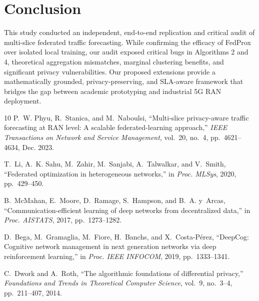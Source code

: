 \documentclass[10pt,journal,compsoc,twocolumn]{article}
\begin{document}
\section{Conclusion}
This study conducted an independent, end-to-end replication and critical audit of multi-slice federated traffic forecasting. While confirming the efficacy of FedProx over isolated local training, our audit exposed critical bugs in Algorithms 2 and 4, theoretical aggregation mismatches, marginal clustering benefits, and significant privacy vulnerabilities. Our proposed extensions provide a mathematically grounded, privacy-preserving, and SLA-aware framework that bridges the gap between academic prototyping and industrial 5G RAN deployment.


\begin{thebibliography}{10}
P.~W. Phyu, R.~Stanica, and M.~Naboulsi, ``Multi-slice privacy-aware traffic forecasting at RAN level: A scalable federated-learning approach,'' \emph{IEEE Transactions on Network and Service Management}, vol.~20, no.~4, pp.~4621--4634, Dec. 2023.

T.~Li, A.~K. Sahu, M.~Zahir, M.~Sanjabi, A.~Talwalkar, and V.~Smith, ``Federated optimization in heterogeneous networks,'' in \emph{Proc. MLSys}, 2020, pp.~429--450.

B.~McMahan, E.~Moore, D.~Ramage, S.~Hampson, and B.~A. y~Arcas, ``Communication-efficient learning of deep networks from decentralized data,'' in \emph{Proc. AISTATS}, 2017, pp.~1273--1282.

D.~Bega, M.~Gramaglia, M.~Fiore, H.~Banchs, and X.~Costa-P{\'e}rez, ``DeepCog: Cognitive network management in next generation networks via deep reinforcement learning,'' in \emph{Proc. IEEE INFOCOM}, 2019, pp.~1333--1341.

C.~Dwork and A.~Roth, ``The algorithmic foundations of differential privacy,'' \emph{Foundations and Trends in Theoretical Computer Science}, vol.~9, no.~3--4, pp.~211--407, 2014.
\end{thebibliography}
\end{document}
